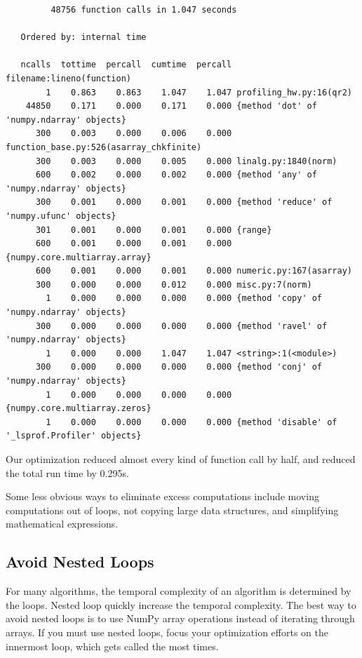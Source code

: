 {\scriptsize
\begin{verbatim}
         48756 function calls in 1.047 seconds

   Ordered by: internal time

   ncalls  tottime  percall  cumtime  percall filename:lineno(function)
        1    0.863    0.863    1.047    1.047 profiling_hw.py:16(qr2)
    44850    0.171    0.000    0.171    0.000 {method 'dot' of 'numpy.ndarray' objects}
      300    0.003    0.000    0.006    0.000 function_base.py:526(asarray_chkfinite)
      300    0.003    0.000    0.005    0.000 linalg.py:1840(norm)
      600    0.002    0.000    0.002    0.000 {method 'any' of 'numpy.ndarray' objects}
      300    0.001    0.000    0.001    0.000 {method 'reduce' of 'numpy.ufunc' objects}
      301    0.001    0.000    0.001    0.000 {range}
      600    0.001    0.000    0.001    0.000 {numpy.core.multiarray.array}
      600    0.001    0.000    0.001    0.000 numeric.py:167(asarray)
      300    0.000    0.000    0.012    0.000 misc.py:7(norm)
        1    0.000    0.000    0.000    0.000 {method 'copy' of 'numpy.ndarray' objects}
      300    0.000    0.000    0.000    0.000 {method 'ravel' of 'numpy.ndarray' objects}
        1    0.000    0.000    1.047    1.047 <string>:1(<module>)
      300    0.000    0.000    0.000    0.000 {method 'conj' of 'numpy.ndarray' objects}
        1    0.000    0.000    0.000    0.000 {numpy.core.multiarray.zeros}
        1    0.000    0.000    0.000    0.000 {method 'disable' of '_lsprof.Profiler' objects}
\end{verbatim}
}

Our optimization reduced almost every kind of function call by half, and reduced the total run time by 0.295s.

Some less obvious ways to eliminate excess computations include moving computations out of loops, not copying large data structures, and simplifying mathematical expressions.


\subsection*{Avoid Nested Loops}
For many algorithms, the temporal complexity of an algorithm is determined by the loops. Nested loop quickly increase the temporal complexity. 
The best way to avoid nested loops is to use NumPy array operations instead of iterating through arrays.
If you must use nested loops, focus your optimization efforts on the innermost loop, which gets called the most times.

